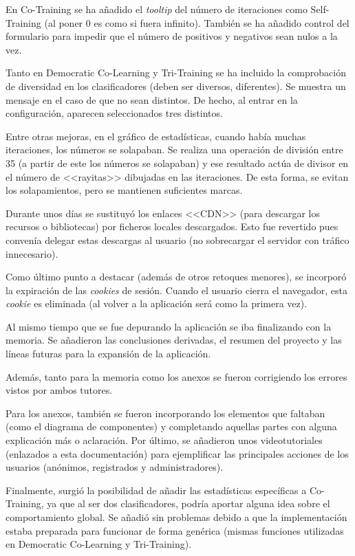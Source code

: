 En Co-Training se ha añadido el \textit{tooltip} del número de iteraciones como
Self-Training (al poner 0 es como si fuera infinito). También se ha añadido
control del formulario para impedir que el número de positivos y negativos sean
nulos a la vez.

Tanto en Democratic Co-Learning y Tri-Training se ha incluido la comprobación de
diversidad en los clasificadores (deben ser diversos, diferentes). Se muestra un
mensaje en el caso de que no sean distintos. De hecho, al entrar en la
configuración, aparecen seleccionados tres distintos.

Entre otras mejoras, en el gráfico de estadísticas, cuando había muchas
iteraciones, los números se solapaban. Se realiza una operación de división
entre 35 (a partir de este los números se solapaban) y ese resultado actúa de
divisor en el número de <<rayitas>> dibujadas en las iteraciones. De esta forma,
se evitan los solapamientos, pero se mantienen suficientes marcas.

Durante unos días se sustituyó los enlaces <<CDN>> (para descargar los recursos
o bibliotecas) por ficheros locales descargados. Esto fue revertido pues
convenía delegar estas descargas al usuario (no sobrecargar el servidor con
tráfico innecesario).

Como último punto a destacar (además de otros retoques menores), se incorporó la
expiración de las \textit{cookies} de sesión. Cuando el usuario cierra el
navegador, esta \textit{cookie} es eliminada (al volver a la aplicación será
como la primera vez).

Al mismo tiempo que se fue depurando la aplicación se iba finalizando con la
memoria. Se añadieron las conclusiones derivadas, el resumen del proyecto y las
líneas futuras para la expansión de la aplicación. 

Además, tanto para la memoria como los anexos se fueron corrigiendo los errores
vistos por ambos tutores.

Para los anexos, también se fueron incorporando los elementos que faltaban (como
el diagrama de componentes) y completando aquellas partes con alguna explicación
más o aclaración. Por último, se añadieron unos videotutoriales (enlazados a
esta documentación) para ejemplificar las principales acciones de los usuarios
(anónimos, registrados y administradores).

Finalmente, surgió la posibilidad de añadir las estadísticas específicas a
Co-Training, ya que al ser dos clasificadores, podría aportar alguna idea sobre
el comportamiento global. Se añadió sin problemas debido a que la implementación
estaba preparada para funcionar de forma genérica (mismas funciones utilizadas
en Democratic Co-Learning y Tri-Training).

